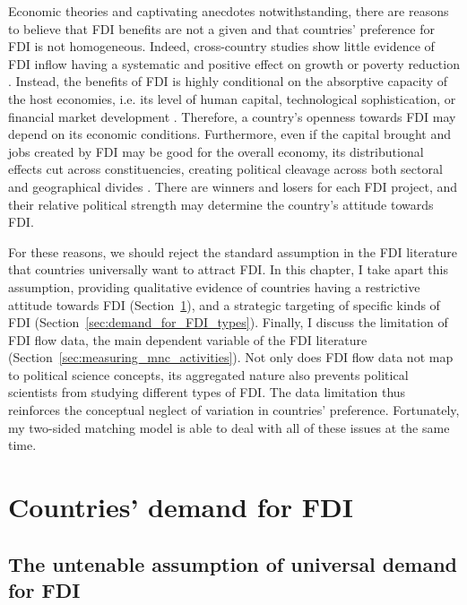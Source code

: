 Economic theories and captivating anecdotes notwithstanding, there are reasons
to believe that FDI benefits are not a given and that countries' preference for
FDI is not homogeneous. Indeed, cross-country studies show little evidence of
FDI inflow having a systematic and positive effect on growth
\citep{Nair-Reichert2001, Carkovic2002} or poverty reduction \citep{Gohou2012}.
Instead, the benefits of FDI is highly conditional on the absorptive capacity of
the host economies, i.e. its level of human capital, technological
sophistication, or financial market development \citep{Durham2004,
  Nunnenkamp2004, Fu2008, Willem2004}. Therefore, a country's openness towards
FDI may depend on its economic conditions. Furthermore, even if the capital
brought and jobs created by FDI may be good for the overall economy, its
distributional effects cut across constituencies, creating political cleavage
across both sectoral and geographical divides \citep{Chintrakarn2012,
  Goldberg2007, Nunnenkamp2007}. There are winners and losers for each FDI
project, and their relative political strength may determine the country's
attitude towards FDI.

For these reasons, we should reject the standard assumption in the FDI
literature that countries universally want to attract FDI. In this chapter, I
take apart this assumption, providing qualitative evidence of countries having a
restrictive attitude towards FDI (Section~\ref{sec:demand_for_FDI}), and a
strategic targeting of specific kinds of FDI
(Section~\ref{sec:demand_for_FDI_types}). Finally, I discuss the limitation of
FDI flow data, the main dependent variable of the FDI literature
(Section~\ref{sec:measuring_mnc_activities}). Not only does FDI flow data not
map to political science concepts, its aggregated nature also prevents political
scientists from studying different types of FDI. The data limitation thus
reinforces the conceptual neglect of variation in countries' preference.
Fortunately, my two-sided matching model is able to deal with all of these
issues at the same time.

\section{Countries' demand for FDI}
\label{sec:demand_for_FDI}

\subsection{The untenable assumption of universal demand for FDI}

